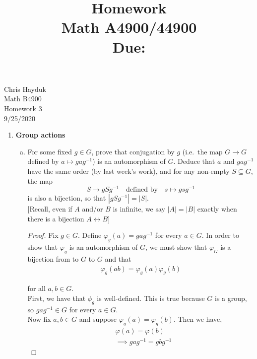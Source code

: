 \documentclass[11pt, reqno]{amsart}
\title[Homework \HW]{Homework \HW \\
Math A4900/44900\\
\small Due: \DUE}
\author{}
\theoremstyle{plain}
\theoremstyle{definition}
\theoremstyle{example}
\def\HW{3}
\def\DUE{9/25/2020}
\begin{document}
\begin{flushright}
Chris Hayduk\\
Math B4900\\
Homework \HW\\
\DUE
\end{flushright}





\begin{enumerate}[1.]
\item {\bf Group actions}

\begin{enumerate}[(a)] 
\item For some fixed $g \in G$, prove that conjugation by $g$ (i.e.\ the map $G \to G$ defined by $a \mapsto gag^{-1}$) is an automorphism of $G$. Deduce that $a$ and $gag^{-1}$ have the same order (by last week's work), and for any non-empty $S \subseteq G$, the map 
$$S \to gSg^{-1} \quad \text{defined by} \quad s \mapsto gsg^{-1}$$
is also a bijection, so that $|gSg^{-1}| = |S|$. \\
{\small[Recall, even if $A$ and/or $B$ is infinite, we say $|A| = |B|$ exactly when there is a bijection  $A \leftrightarrow B$]}

\begin{proof}
Fix $g \in G$. Define $\varphi_g(a) = gag^{-1}$ for every $a \in G$. In order to show that $\varphi_g$ is an automorphism of $G$, we must show that $\varphi_G$ is a bijection from to $G$ to $G$ and that
\begin{align*}
\varphi_g(ab) = \varphi_g(a)\varphi_g(b)
\end{align*}

for all $a, b \in G$.\\

First, we have that $\phi_g$ is well-defined. This is true because $G$ is a group, so $gag^{-1} \in G$ for every $a \in G$.\\

Now fix $a, b \in G$ and suppose $\varphi_g(a) = \varphi_g(b)$. Then we have,
\begin{align*}
&\varphi(a) = \varphi(b)\\
&\implies gag^{-1} = gbg^{-1}
\end{align*}


\end{proof}
\end{enumerate}
\end{enumerate}
\end{document}
